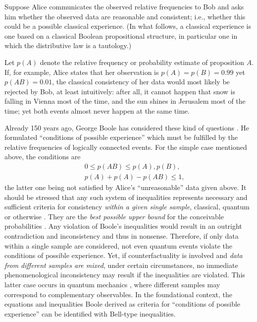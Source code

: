 Suppose Alice communicates the observed relative frequencies to Bob and asks him
whether the observed data are reasonable and consistent; i.e.,
whether this could be a possible classical experience.
(In what follows, a classical experience is one based on a classical Boolean propositional
structure, in particular one in which the distributive law is a tautology.)

Let $p(A)$ denote the relative frequency or probability estimate of proposition $A$.
If, for example, Alice states that her observation is
$p(A)=p(B)=0.99$ yet $p(AB)=0.01$, the classical consistency of her data would most likely be
rejected by Bob, at least intuitively: after all,
it cannot happen that snow is falling  in Vienna most of the time, and the sun shines in Jerusalem
most of the time; yet both events almost never happen at the same time.

Already 150 years ago, George Boole has considered these kind of questions \cite{Boole,Boole-62,Hailperin,pitowsky,Pit-94}.
He formulated ``conditions of possible experience'' which must be fulfilled by the relative
frequencies of logically connected events.
For the simple case mentioned above, the conditions are
\begin{eqnarray}
&&0\le p(AB)\le p(A),p(B),\nonumber\\
&&p(A)+ p(A)-p(AB)\le 1,\nonumber
\end{eqnarray}
the latter one being not satisfied by Alice's ``unreasonable'' data given above.
It should be stressed that any such system of inequalities
represents necessary and sufficient criteria for consistency {\em within a given single sample},
classical, quantum or otherwise \cite[Chapter10]{svozil-ql}.
They are the {\em best possible upper bound} for the conceivable probabilities \cite{Hailperin,pitowsky}.
Any violation of Boole's inequalities would result
in an outright contradiction and inconsistency and thus in nonsense.
Therefore, if only data within a single sample are considered,
not even quantum events violate the conditions of possible experience.
Yet, if counterfactuality is involved and  {\em  data from different samples are mixed},
under certain circumstances,
no immediate phenomenological inconsistency may result if the inequalities are violated.
This latter  case occurs in quantum mechanics \cite{Pit-94},
where different samples may correspond to
complementary observables.
In the foundational context, the
equations and inequalities Boole derived as criteria for
``conditions of possible experience''
can be identified with Bell-type inequalities.


